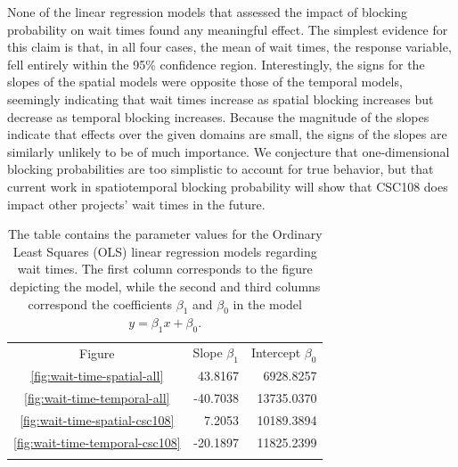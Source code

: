 None of the linear regression models that assessed the impact of blocking
probability on wait times found any meaningful effect. The simplest evidence
for this claim is that, in all four cases, the mean of wait times, the response
variable, fell entirely within the 95\% confidence region. Interestingly, the
signs for the slopes of the spatial models were opposite those of the temporal
models, seemingly indicating that wait times increase as spatial blocking
increases but decrease as temporal blocking increases. Because the magnitude of
the slopes indicate that effects over the given domains are small, the signs of
the slopes are similarly unlikely to be of much importance. We conjecture that
one-dimensional blocking probabilities are too simplistic to account for true
behavior, but that current work in spatiotemporal blocking probability will
show that CSC108 does impact other projects' wait times in the future.


\begin{table}
\caption{The table contains the parameter values for the Ordinary Least Squares
(OLS) linear regression models regarding wait times. The first column
corresponds to the figure depicting the model, while the second and third
columns correspond the coefficients $\beta_1$ and $\beta_0$ in the model
$y = \beta_{1}x + \beta_0$.}
\label{tab:wait-time-params}       %
\begin{tabular}{crr}
\hline\noalign{\smallskip}
Figure  & Slope $\beta_1$ & Intercept $\beta_0$  \\
\noalign{\smallskip}\hline\noalign{\smallskip}
\ref{fig:wait-time-spatial-all}     &    43.8167    &    6928.8257  \\
\ref{fig:wait-time-temporal-all}    &   -40.7038    &   13735.0370  \\
\ref{fig:wait-time-spatial-csc108}  &     7.2053    &   10189.3894  \\
\ref{fig:wait-time-temporal-csc108} &   -20.1897    &   11825.2399  \\
\noalign{\smallskip}\hline
\end{tabular}
\end{table}


